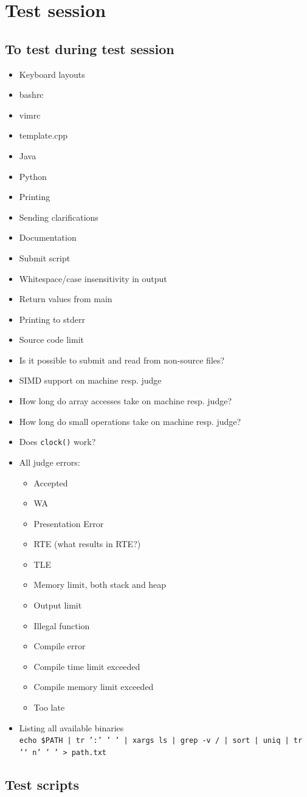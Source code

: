 \chapter{Test session}

\section{To test during test session}
\begin{itemize}
	\item Keyboard layouts
	\item bashrc
	\item vimrc
	\item template.cpp
	\item Java
	\item Python
	\item Printing
	\item Sending clarifications
	\item Documentation
	\item Submit script
	\item Whitespace/case insensitivity in output
	\item Return values from main
	\item Printing to stderr
	\item Source code limit
	\item Is it possible to submit and read from non-source files?
	\item SIMD support on machine resp. judge
	\item How long do array accesses take on machine resp. judge?
	\item How long do small operations take on machine resp. judge?
	\item Does \texttt{clock()} work?
	\item All judge errors:
		\begin{itemize}
			\item Accepted
			\item WA
			\item Presentation Error
			\item RTE (what results in RTE?)
			\item TLE
			\item Memory limit, both stack and heap
			\item Output limit
			\item Illegal function
			\item Compile error
			\item Compile time limit exceeded
			\item Compile memory limit exceeded
			\item Too late
		\end{itemize}
	\item Listing all available binaries\\
		\texttt{echo \$PATH | tr ':' ' ' | xargs ls | grep -v / | sort | uniq | tr '\char`\\n' ' ' > path.txt}
\end{itemize}

\section{Test scripts}

